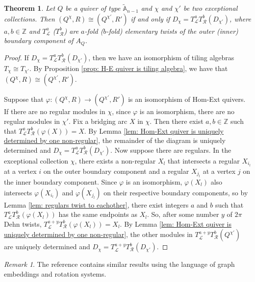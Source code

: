 \documentclass[12pt]{amsart}
\theoremstyle{plain}
\newtheorem{thm}{Theorem}[section]
\theoremstyle{definition}
\theoremstyle{remark}
\newtheorem{rem}{Remark}[section]
\begin{document}
\begin{thm}\label{thm: iso H-E quiver iff Dehn twist}
Let $Q$ be a quiver of type $\tilde{\mathbb{A}}_{n-1}$ and $\chi$ and $\chi'$ be two exceptional collections. Then $(Q^{\chi},R) \cong (Q^{\chi'},R')$ if and only if $D_{\chi} = T_{\mathcal{L}}^a T_{\mathcal{R}}^b(D_{\chi'})$, where $a,b \in \mathbb{Z}$ {\color{black} and $T^a_{\mathcal{L}}$ ($T^b_{\mathcal{R}}$) are $a$-fold ($b$-fold) elementary twists of the outer (inner) boundary component of $A_{Q}$.}
\end{thm}

\begin{proof}
If $D_{\chi} = T_{\mathcal{L}}^a T_{\mathcal{R}}^b(D_{\chi'})$, then we have an isomorphism of tiling algebras $T_{\chi} \cong T_{\chi'}$. By Proposition \ref{prop: H-E quiver is tiling algebra}, we have that $(Q^{\chi},R) \cong (Q^{\chi'},R')$.

Suppose that $\varphi: (Q^{\chi},R) \rightarrow (Q^{
\chi'},R')$ is an isomorphism of Hom-Ext quivers. If there are no regular modules in $\chi$, since $\varphi$ is an isomorphism, there are no regular modules in $\chi'$. Fix a bridging arc $X$ in $\chi$. Then there exist $a,b \in \mathbb{Z}$ such that $T^a_{\mathscr{L}}T^b_{\mathscr{R}}(\varphi(X)) = X$. By Lemma \ref{lem: Hom-Ext quiver is uniquely determined by one non-regular}, the remainder of the diagram is uniquely determined and $D_{\chi} = T^a_{\mathscr{L}}T^b_{\mathscr{R}}(D_{\chi'})$. Now suppose there are regulars. In the exceptional collection $\chi$, there exists a non-regular $X_l$ that intersects a regular $X_{i_l}$ at a vertex $i$ on the outer boundary component and a regular $X_{j_l}$ at a vertex $j$ on the inner boundary component. Since $\varphi$ is an isomorphism, $\varphi(X_l)$ also intersects $\varphi(X_{i_l})$ and $\varphi(X_{j_l})$ on their respective boundary components, so  by Lemma \ref{lem: regulars twist to eachother}, there exist integers $a$ and $b$ such that  $T_{\mathcal{L}}^a T_{\mathcal{R}}^b(\varphi(X_l))$ has the same endpoints as $X_l$. So, after some number $y$ of $2\pi$ Dehn twists, $T_{\mathcal{L}}^{a+y} T_{\mathcal{R}}^b(\varphi(X_l)) = X_l$. By Lemma \ref{lem: Hom-Ext quiver is uniquely determined by one non-regular}, the other modules in $T_{\mathcal{L}}^{a+y} T_{\mathcal{R}}^b(Q^{\chi'})$ are uniquely determined and $D_{\chi} = T_{\mathcal{L}}^{a+y} T_{\mathcal{R}}^b(D_{\chi'})$.
\end{proof}

\begin{rem}
    The reference \cite{gross2001topological} contains similar results using the language of graph embeddings and rotation systems. 
\end{rem}
\end{document}
